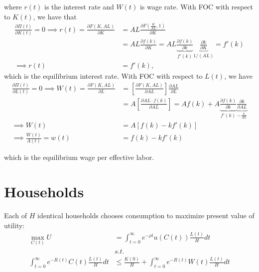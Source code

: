\documentclass[../main.tex]{subfiles}
\begin{document}
        where $r(t)$ is the interest rate and $W(t)$ is wage rate. With FOC with respect to $K(t)$, we have that
        \begin{align}
            \frac{\partial \Pi(t)}{\partial K(t)}  = 0
            \implies
            r(t)
            = \frac{\partial F(K, AL)}{\partial K}
            &= AL \frac{\partial F\left(\frac{K}{AL}, 1\right)}{\partial K}
            \\
            &= AL
            \frac{\partial f(k)}{\partial K}
            = AL
            \underbrace{\frac{\partial f(k)}{\partial k}}_{f'(k)}
            \underbrace{\frac{\partial k}{\partial K}}_{1/(AL)} = f'(k)
            \\
            \implies
            r(t) &= f'(k),
            \label{eqn:rck-eqm-interest}
        \end{align}
        which is the equilibrium interest rate. With FOC with respect to $L(t)$, we have
        \begin{align}
            \frac{\partial \Pi(t)}{\partial L(t)}  = 0
            \implies
            W(t)
            = \frac{\partial F(K, AL)}{\partial L}
            &= \left[\frac{\partial F(K, AL)}{\partial AL}\right]
            \frac{\partial AL}{\partial L}
            \\
            &= A \left[\frac{\partial AL \cdot f(k)}{\partial AL}\right]
            = A f(k) + A
            \underbrace{\frac{\partial f(k)}{\partial k}}_{f'(k)}
            \underbrace{\frac{\partial k}{\partial AL}}_{-\frac{k}{AL}}
            \\
            \implies
            W(t) &= A [f(k) - k f'(k)]
            \\
            \implies
            \frac{W(t)}{A(t)} = w(t)
            &= f(k) - k f'(k)
            \label{eqn:rck-eqm-wage}
        \end{align}
        
        which is the equilibrium wage per effective labor.
        
    \section{Households}
        
        Each of $H$ identical households chooses consumption to maximize present value of utility:
        \begin{align}
            \max_{C(t)} U
            &= \int_{t=0}^\infty e^{-\rho t} u(C(t)) \frac{L(t)}{H} dt
            \label{eqn:rck-pv}
            \\
            &  s.t. \nonumber
            \\
            \int_{t=0}^\infty e^{-R(t)} C(t) \frac{L(t)}{H} dt
            &\le
            \frac{K(0)}{H} + \int_{t=0}^\infty e^{-R(t)} W(t) \frac{L(t)}{H} dt
            \label{eqn:rck-bc}
        \end{align}
        
\end{document}
